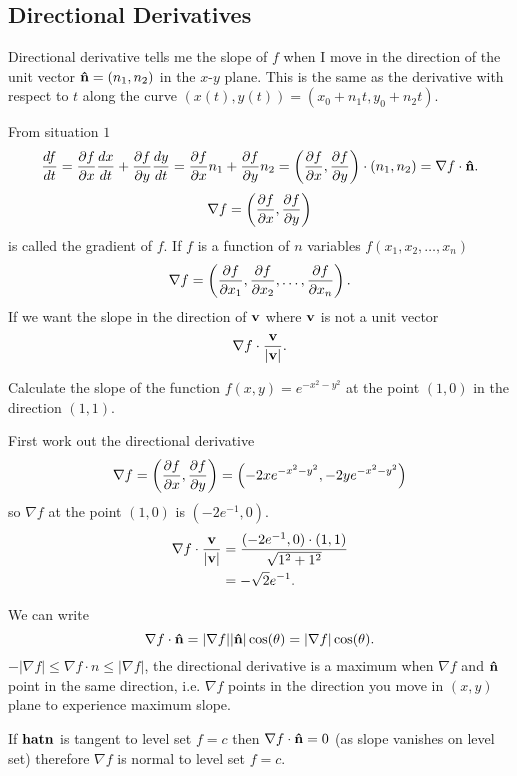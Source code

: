 \documentclass[10pt, a4paper]{article}
\begin{document}
\subsection{Directional Derivatives}
Directional derivative tells me the slope of $f$ when I move in the direction of the unit vector $\mbf{\hat{n}} = (n_1, n_2)$ in the $x$-$y$ plane.
This is the same as the derivative with respect to $t$ along the curve $(x(t), y(t)) = (x_0 + n_1t, y_0 + n_2t)$.

From situation $1$
\[
\frac{df}{dt} = \pd[f]{x}\frac{dx}{dt} + \pd[f]{y}\frac{dy}{dt} = \pd[f]{x}n_1 + \pd[f]{y}n_2 = \left(\pd[f]{x}, \pd[f]{y}\right)\cdot (n_1, n_2) = \nabla f \cdot \mbf{\hat{n}}.
\]
\[
\nabla f = \left(\pd[f]{x}, \pd[f]{y}\right)
\]
is called the gradient of $f$.
If $f$ is a function of $n$ variables $f(x_1, x_2, \dotsc, x_n)$
\[
\nabla f = \left(\pd[f]{x_1}, \pd[f]{x_2}, \dotsc, \pd[f]{x_n}\right).
\]
If we want the slope in the direction of $\mbf{v}$ where $\mbf{v}$ is not a unit vector
\[
\nabla f \cdot \frac{\mbf{v}}{|\mbf{v}|}.
\]

\begin{example}
    Calculate the slope of the function $f(x, y) = e ^ {-x ^ 2 - y ^ 2}$ at the point $(1, 0)$ in the direction $(1, 1)$.

    \begin{solution}
        First work out the directional derivative
        \[
        \nabla f = \left(\pd[f]{x}, \pd[f]{y}\right) = \left(-2xe ^ {-x ^ 2 - y ^ 2}, -2ye ^ {-x ^ 2 - y ^ 2}\right)
        \]
        so $\nabla f$ at the point $(1, 0)$ is $(-2e ^ {-1}, 0)$.
        \begin{align*}
            \nabla f \cdot \frac{\mbf{v}}{|\mbf{v}|} &= \frac{(-2e ^ {-1}, 0) \cdot (1, 1)}{\sqrt{1 ^ 2 + 1 ^ 2}} \\
            &= -\sqrt{2}e ^ {-1}.
        \end{align*}
    \end{solution}
\end{example}

We can write
\[
\nabla f \cdot \mbf{\hat{n}} = |\nabla f||\mbf{\hat{n}}|\cos(\theta) = |\nabla f|\cos(\theta).
\]
$-|\nabla f| \leq \nabla f \cdot n \leq |\nabla f|$,
the directional derivative is a maximum when $\nabla f$ and $\mbf{\hat{n}}$ point in the same direction,
i.e. $\nabla f$ points in the direction you move in $(x, y)$ plane to experience maximum slope.

If $\mbf{hat{n}}$ is tangent to level set $f = c$ then $\nabla f \cdot \mbf{\hat{n}} = 0$
(as slope vanishes on level set)
therefore $\nabla f$ is normal to level set $f = c$.
\end{document}
